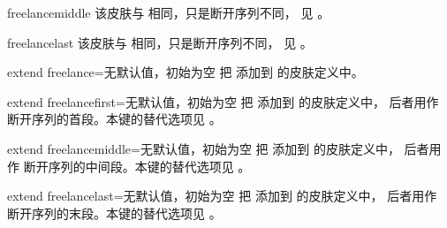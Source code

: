 \begin{docSkin}{freelancemiddle}
  该皮肤与  相同，只是断开序列不同，
  见 。
\end{docSkin}

\begin{docSkin}{freelancelast}
  该皮肤与  相同，只是断开序列不同，
  见 。
\end{docSkin}


\begin{docTcbKey}{extend freelance}{=}{无默认值，初始为空}
把  添加到  的皮肤定义中。
\end{docTcbKey}

\begin{docTcbKey}{extend freelancefirst}{=}{无默认值，初始为空}
把  添加到  的皮肤定义中，
后者用作  断开序列的首段。本键的替代选项见
。
\end{docTcbKey}

\begin{docTcbKey}{extend freelancemiddle}{=}{无默认值，初始为空}
把  添加到  的皮肤定义中，
后者用作  断开序列的中间段。本键的替代选项见
。
\end{docTcbKey}

\enlargethispage*{1cm}

\begin{docTcbKey}{extend freelancelast}{=}{无默认值，初始为空}
把  添加到  的皮肤定义中，
后者用作  断开序列的末段。本键的替代选项见
。
\end{docTcbKey}



